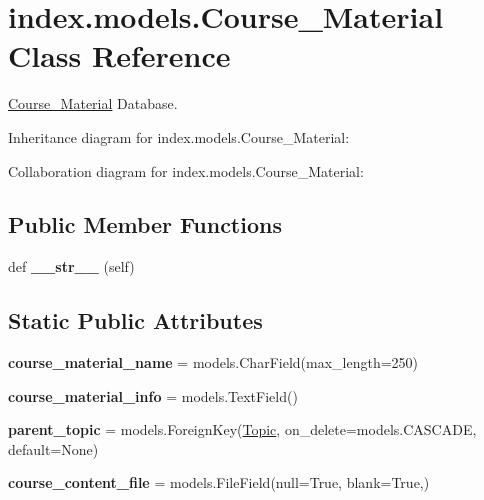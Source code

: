 \hypertarget{classindex_1_1models_1_1Course__Material}{}\section{index.\+models.\+Course\+\_\+\+Material Class Reference}
\label{classindex_1_1models_1_1Course__Material}


\hyperlink{classindex_1_1models_1_1Course__Material}{Course\+\_\+\+Material} Database.  




Inheritance diagram for index.\+models.\+Course\+\_\+\+Material\+:


Collaboration diagram for index.\+models.\+Course\+\_\+\+Material\+:
\subsection*{Public Member Functions}
\begin{DoxyCompactItemize}
\item 
\mbox{\label{classindex_1_1models_1_1Course__Material_aa06103c6ca8e7c931872f94d80540565}} 
def {\bfseries \+\_\+\+\_\+str\+\_\+\+\_\+} (self)
\end{DoxyCompactItemize}
\subsection*{Static Public Attributes}
\begin{DoxyCompactItemize}
\item 
\mbox{\label{classindex_1_1models_1_1Course__Material_a3be9e6853cbed43a05319ed97bcda415}} 
{\bfseries course\+\_\+material\+\_\+name} = models.\+Char\+Field(max\+\_\+length=250)
\item 
\mbox{\label{classindex_1_1models_1_1Course__Material_ac6515b3bc5402fb209dbea8e32f0d466}} 
{\bfseries course\+\_\+material\+\_\+info} = models.\+Text\+Field()
\item 
\mbox{\label{classindex_1_1models_1_1Course__Material_a351b489478e74259fb0b79e4a9a573ee}} 
{\bfseries parent\+\_\+topic} = models.\+Foreign\+Key(\hyperlink{classindex_1_1models_1_1Topic}{Topic}, on\+\_\+delete=models.\+C\+A\+S\+C\+A\+DE, default=None)
\item 
\mbox{\label{classindex_1_1models_1_1Course__Material_ad134cae6e11c3bee34718b4d73c76c5b}} 
{\bfseries course\+\_\+content\+\_\+file} = models.\+File\+Field(null=True, blank=True,)
\end{DoxyCompactItemize}


